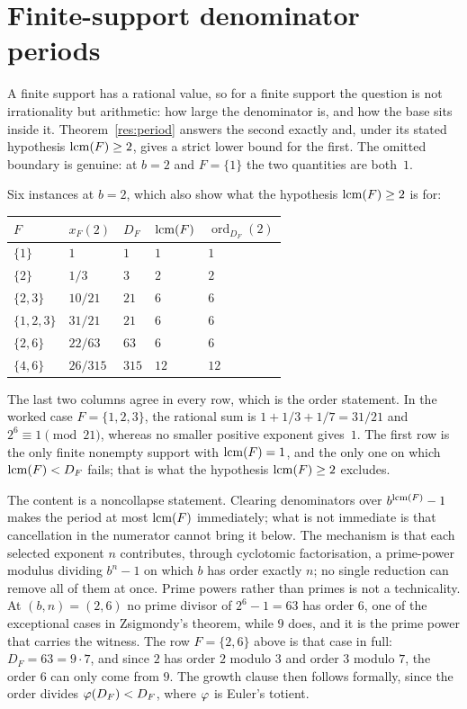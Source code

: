 \documentclass[11pt]{article}
\begin{document}
\section{Finite-support denominator periods}\label{sec:period}

A finite support has a rational value, so for a finite support the question is
not irrationality but arithmetic: how large the denominator is, and how the
base sits inside it.  Theorem~\ref{res:period} answers the second exactly and,
under its stated hypothesis $\operatorname{lcm}(F)\ge2$, gives a strict lower bound for the
first.  The omitted boundary is genuine: at $b=2$ and $F=\{1\}$ the two
quantities are both~$1$.

Six instances at $b=2$, which also show what the hypothesis
$\operatorname{lcm}(F)\ge2$ is for:
\begin{center}
\begin{tabular}{@{}lllll@{}}
\toprule
$F$ & $x_F(2)$ & $D_F$ & $\operatorname{lcm}(F)$ & $\operatorname{ord}_{D_F}(2)$\\
\midrule
$\{1\}$   & $1$      & $1$   & $1$  & $1$\\
$\{2\}$   & $1/3$    & $3$   & $2$  & $2$\\
$\{2,3\}$ & $10/21$  & $21$  & $6$  & $6$\\
$\{1,2,3\}$ & $31/21$  & $21$  & $6$  & $6$\\
$\{2,6\}$ & $22/63$  & $63$  & $6$  & $6$\\
$\{4,6\}$ & $26/315$ & $315$ & $12$ & $12$\\
\bottomrule
\end{tabular}
\end{center}
The last two columns agree in every row, which is the order statement.  In the
worked case $F=\{1,2,3\}$, the rational sum is $1+1/3+1/7=31/21$ and
$2^6\equiv1\pmod {21}$, whereas no smaller positive exponent gives~$1$.
The
first row is the only finite nonempty support with $\operatorname{lcm}(F)=1$, and the only
one on which $\operatorname{lcm}(F)<D_F$ fails; that is what the hypothesis $\operatorname{lcm}(F)\ge2$
excludes.

The content is a noncollapse statement.  Clearing denominators over
$b^{\operatorname{lcm}(F)}-1$ makes the period at most $\operatorname{lcm}(F)$ immediately; what is not
immediate is that cancellation in the numerator cannot bring it below.  The
mechanism is that each selected exponent $n$ contributes, through cyclotomic
factorisation, a prime-power modulus dividing $b^{n}-1$ on which $b$ has order exactly
$n$; no single reduction can remove all of them at once.  Prime powers rather
than primes is not a technicality.  At $(b,n)=(2,6)$ no prime divisor of
$2^6-1=63$ has order $6$, one of the exceptional cases in Zsigmondy's
theorem, while $9$ does, and it
is the prime power that carries the witness.  The row $F=\{2,6\}$ above is that
case in full: $D_F=63=9\cdot7$, and since $2$ has order $2$ modulo $3$ and
order $3$ modulo $7$, the order $6$ can only come from $9$.  The growth clause
then follows formally, since the order divides $\varphi(D_F)<D_F$, where $\varphi$ is
Euler's totient.
\end{document}
